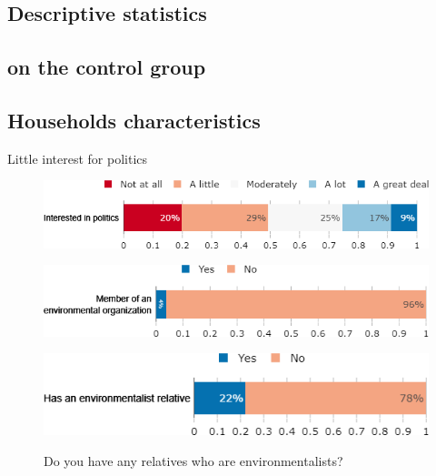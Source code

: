 \begin{framefont}{\small}
\section{Descriptive statistics \\ \quad \\ on the control group}




\subsection{Households characteristics}

\begin{frame}{Little interest for politics}%
\vspace{-.5cm}
\begin{figure}[h!]
\caption{To what extent are you interested in politics?}
\includegraphics[width=.52\paperwidth]{../figures/FR/interested_politics_FR.png} \\
\vspace{.1cm}
\caption{Are you member of an environmental organization?}
\includegraphics[width=.47\paperwidth]{../figures/FR/member_environmental_orga_FR.png}\\
\vspace{.1cm}
\caption{Do you have any relatives who are environmentalists?}
\includegraphics[width=.47\paperwidth]{../figures/FR/relative_environmentalist_FR.png}\\
\end{figure}
\end{frame}


\end{framefont}
